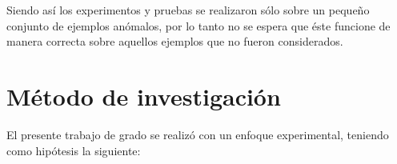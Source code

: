 \vspace{5mm} %

Siendo as\'{i} los experimentos y pruebas se realizaron s\'{o}lo sobre un peque\~{n}o conjunto de ejemplos an\'{o}malos, por lo tanto no se espera que \'{e}ste funcione de manera correcta sobre aquellos ejemplos que no fueron considerados.

\section{M\'{e}todo de investigaci\'{o}n}

El presente trabajo de grado se realiz\'{o} con un enfoque experimental, teniendo como hip\'{o}tesis la siguiente:

